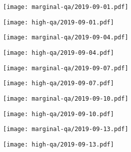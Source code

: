 \documentclass{article}
\begin{document}
\begin{figure}[H]
	\ContinuedFloat
	\centering
	\begin{subfigure}{0.48\linewidth}
		\texttt{[image: marginal-qa/2019-09-01.pdf]}
	\end{subfigure}
	\begin{subfigure}{0.48\linewidth}
		\texttt{[image: high-qa/2019-09-01.pdf]}
	\end{subfigure}
	\begin{subfigure}{0.48\linewidth}
		\texttt{[image: marginal-qa/2019-09-04.pdf]}
	\end{subfigure}
	\begin{subfigure}{0.48\linewidth}
		\texttt{[image: high-qa/2019-09-04.pdf]}
	\end{subfigure}
	\begin{subfigure}{0.48\linewidth}
		\texttt{[image: marginal-qa/2019-09-07.pdf]}
	\end{subfigure}
	\begin{subfigure}{0.48\linewidth}
		\texttt{[image: high-qa/2019-09-07.pdf]}
	\end{subfigure}
	\begin{subfigure}{0.48\linewidth}
		\texttt{[image: marginal-qa/2019-09-10.pdf]}
	\end{subfigure}
	\begin{subfigure}{0.48\linewidth}
		\texttt{[image: high-qa/2019-09-10.pdf]}
	\end{subfigure}
	\begin{subfigure}{0.48\linewidth}
		\texttt{[image: marginal-qa/2019-09-13.pdf]}
	\end{subfigure}
	\begin{subfigure}{0.48\linewidth}
		\texttt{[image: high-qa/2019-09-13.pdf]}
	\end{subfigure}
\end{figure}
\end{document}
